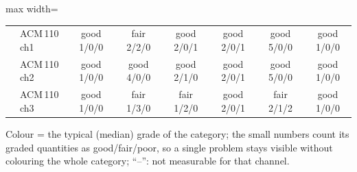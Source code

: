 \begin{table}[H]
\begin{adjustbox}{max width=\linewidth}
\begin{tabular}{llcccccc}
 & ACM\,110 ch1 & \cellcolor{good}good \scriptsize{1/0/0} & \cellcolor{fair}fair \scriptsize{2/2/0} & \cellcolor{good}good \scriptsize{2/0/1} & \cellcolor{good}good \scriptsize{2/0/1} & \cellcolor{good}good \scriptsize{5/0/0} & \cellcolor{good}good \scriptsize{1/0/0}\\
 & ACM\,110 ch2 & \cellcolor{good}good \scriptsize{1/0/0} & \cellcolor{good}good \scriptsize{4/0/0} & \cellcolor{good}good \scriptsize{2/1/0} & \cellcolor{good}good \scriptsize{2/0/1} & \cellcolor{good}good \scriptsize{5/0/0} & \cellcolor{good}good \scriptsize{1/0/0}\\
 & ACM\,110 ch3 & \cellcolor{good}good \scriptsize{1/0/0} & \cellcolor{fair}fair \scriptsize{1/3/0} & \cellcolor{fair}fair \scriptsize{1/2/0} & \cellcolor{good}good \scriptsize{2/0/1} & \cellcolor{fair}fair \scriptsize{2/1/2} & \cellcolor{good}good \scriptsize{1/0/0}\\
\bottomrule\end{tabular}\end{adjustbox}
\par\smallskip\footnotesize Colour = the typical (median) grade of the category; the small numbers count its graded quantities as good/fair/poor, so a single problem stays visible without colouring the whole category; ``--'': not measurable for that channel.
\end{table}
